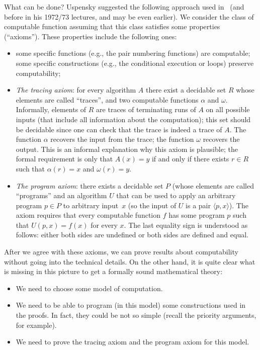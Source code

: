 \documentclass[12pt]{article}
\theoremstyle{remark}
\begin{document}
What can be done? Uspensky suggested the following approach used in~\cite{1974} (and before in his 1972/73 lectures, and may be even earlier). We consider the class of computable function assuming that this class satisfies some properties (``axioms''). These properties include the following ones:
\begin{itemize}
\item some specific functions (e.g., the pair numbering functions) are computable; some specific constructions (e.g., the conditional execution or loops) preserve computability;

\item \emph{The tracing axiom}: for every algorithm $A$ there exist a decidable set $R$ whose elements are called ``traces'', and two computable functions $\alpha$ and $\omega$. Informally, elements of $R$ are traces of terminating runs of $A$ on all possible inputs (that include all information about the computation); this set should be decidable since one can check that the trace is indeed a trace of $A$. The function $\alpha$ recovers the input from the trace; the function $\omega$ recovers the output. This is an informal explanation why this axiom is plausible; the formal requirement is only that $A(x)=y$ if and only if there exists $r\in R$ such that $\alpha(r)=x$ and $\omega(r)=y$.

\item \emph{The program axiom}: there exists a decidable set $P$ (whose elements are called ``programs'' and an algorithm $U$ that can be used to apply an arbitrary program $p\in P$ to arbitrary input~$x$ (so the input of $U$ is a pair $\langle p,x\rangle$). The axiom requires that every computable function $f$ has some program $p$ such that $U(p,x)=f(x)$ for every $x$. The last equality sign is understood as follows: either both sides are undefined or both sides are defined and equal.
\end{itemize}

After we agree with these axioms, we can prove results about computability without going into the technical details. On the other hand, it is quite clear what is missing in this picture to get a formally sound mathematical theory:
\begin{itemize}
\item We need to choose some model of computation.
\item We need to be able to program (in this model) some constructions used in the proofs. In fact, they could be not so simple (recall the priority arguments, for example).
\item We need to prove the tracing axiom and the program axiom for this model.
\end{itemize} 
\end{document}
